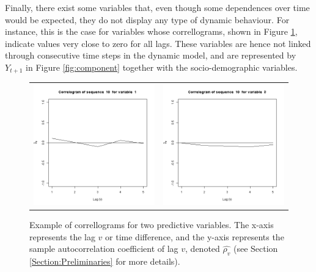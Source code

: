 Finally, there exist some variables that, even though some dependences over time would be expected, they do not display any type of dynamic behaviour. For instance, this is the case for variables whose correllograms, shown in Figure \ref{fig:cajamarCorr}, indicate values very close to zero for all lags. These variables are hence not linked through consecutive time steps in the dynamic model, and are represented by $Y_{t+1}$ in Figure \ref{fig:component} together with the socio-demographic variables.

\begin{figure}[h]
  \centering
    \begin{tabular}{cc}
    \includegraphics[width=70mm]{figures/CajaMarcrl1}&
     \includegraphics[width=70mm]{figures/CajaMarcrl3}\\
  \end{tabular}
    \caption{\label{fig:cajamarCorr}Example of correllograms for two predictive variables.  The x-axis represents the lag $v$ or time difference, and the y-axis represents the sample autocorrelation coefficient of lag $v$, denoted $\hat{\rho_v}$ (see Section \ref{Section:Preliminaries} for more details).}
\end{figure}

